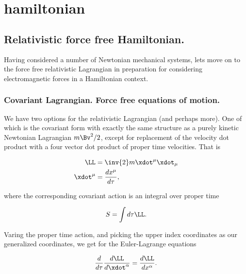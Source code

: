 

\chapter{hamiltonian}
\label{chap:hamiltonian}
{}
\date{Nov 15, 2009}

\beginArtWithToc

\section{Relativistic force free Hamiltonian.}

Having considered a number of Newtonian mechanical systems, lets move on to the force free relativistic Lagrangian in preparation for considering electromagnetic forces in a Hamiltonian context.

\subsection{Covariant Lagrangian.  Force free equations of motion.}

We have two options for the relativistic Lagrangian (and perhaps more).  One of which is the covariant form with exactly the same structure as a purely kinetic Newtonian Lagrangian $m \Bv^2/2$, except for replacement of the velocity dot product with a four vector dot product of proper time velocities.  That is

\begin{align}\label{eqn:hamiltonian:qqq1}
\LL &= \inv{2} m \xdot^\mu \xdot_\mu \\
\xdot^\mu &= \frac{d x^\mu}{d \tau},
\end{align}

where the corresponding covariant action is an integral over proper time

\begin{align}\label{eqn:hamiltonian:qqq2}
S = \int d\tau \LL.
\end{align}

Varing the proper time action, and picking the upper index coordinates as our generalized coordinates, we get for the Euler-Lagrange equations 

\begin{align}\label{eqn:hamiltonian:qqq3}
\frac{d}{d \tau} \frac{d \LL}{d \xdot^\alpha} = \frac{d \LL}{d x^\alpha}.
\end{align}


